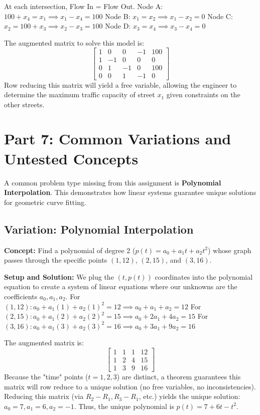 \documentclass[11pt]{article}
\begin{document}
At each intersection, Flow In = Flow Out.
Node A: $100 + x_4 = x_1 \implies x_1 - x_4 = 100$
Node B: $x_1 = x_2 \implies x_1 - x_2 = 0$
Node C: $x_2 = 100 + x_3 \implies x_2 - x_3 = 100$
Node D: $x_3 = x_4 \implies x_3 - x_4 = 0$

The augmented matrix to solve this model is:
\[ \begin{bmatrix} 1 & 0 & 0 & -1 & 100 \\ 1 & -1 & 0 & 0 & 0 \\ 0 & 1 & -1 & 0 & 100 \\ 0 & 0 & 1 & -1 & 0 \end{bmatrix} \]
Row reducing this matrix will yield a free variable, allowing the engineer to determine the maximum traffic capacity of street $x_1$ given constraints on the other streets.

\newpage
\section{Part 7: Common Variations and Untested Concepts}

A common problem type missing from this assignment is \textbf{Polynomial Interpolation}. This demonstrates how linear systems guarantee unique solutions for geometric curve fitting.

\subsection{Variation: Polynomial Interpolation}
\textbf{Concept:} Find a polynomial of degree 2 ($p(t) = a_0 + a_1t + a_2t^2$) whose graph passes through the specific points $(1, 12)$, $(2, 15)$, and $(3, 16)$.

\textbf{Setup and Solution:}
We plug the $(t, p(t))$ coordinates into the polynomial equation to create a system of linear equations where our unknowns are the coefficients $a_0, a_1, a_2$.
For $(1, 12): a_0 + a_1(1) + a_2(1)^2 = 12 \implies a_0 + a_1 + a_2 = 12$
For $(2, 15): a_0 + a_1(2) + a_2(2)^2 = 15 \implies a_0 + 2a_1 + 4a_2 = 15$
For $(3, 16): a_0 + a_1(3) + a_2(3)^2 = 16 \implies a_0 + 3a_1 + 9a_2 = 16$

The augmented matrix is:
\[ \begin{bmatrix} 1 & 1 & 1 & 12 \\ 1 & 2 & 4 & 15 \\ 1 & 3 & 9 & 16 \end{bmatrix} \]
Because the "time" points ($t=1, 2, 3$) are distinct, a theorem guarantees this matrix will row reduce to a unique solution (no free variables, no inconsistencies).
Reducing this matrix (via $R_2 - R_1, R_3 - R_1$, etc.) yields the unique solution:
$a_0 = 7, a_1 = 6, a_2 = -1$.
Thus, the unique polynomial is $p(t) = 7 + 6t - t^2$.
\end{document}
